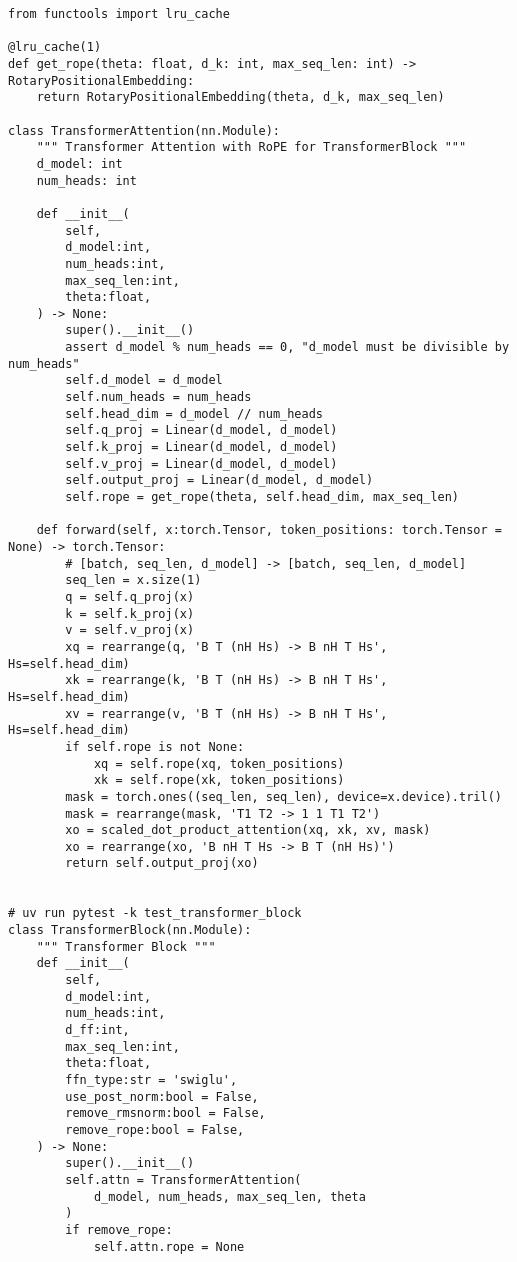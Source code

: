 \begin{lstlisting}
from functools import lru_cache

@lru_cache(1)
def get_rope(theta: float, d_k: int, max_seq_len: int) -> RotaryPositionalEmbedding:
    return RotaryPositionalEmbedding(theta, d_k, max_seq_len)

class TransformerAttention(nn.Module):
    """ Transformer Attention with RoPE for TransformerBlock """
    d_model: int
    num_heads: int
    
    def __init__(
        self, 
        d_model:int, 
        num_heads:int,
        max_seq_len:int,
        theta:float,
    ) -> None:
        super().__init__()
        assert d_model % num_heads == 0, "d_model must be divisible by num_heads"
        self.d_model = d_model
        self.num_heads = num_heads
        self.head_dim = d_model // num_heads
        self.q_proj = Linear(d_model, d_model)
        self.k_proj = Linear(d_model, d_model)
        self.v_proj = Linear(d_model, d_model)
        self.output_proj = Linear(d_model, d_model)
        self.rope = get_rope(theta, self.head_dim, max_seq_len)
    
    def forward(self, x:torch.Tensor, token_positions: torch.Tensor = None) -> torch.Tensor:
        # [batch, seq_len, d_model] -> [batch, seq_len, d_model]
        seq_len = x.size(1)
        q = self.q_proj(x)
        k = self.k_proj(x)
        v = self.v_proj(x)
        xq = rearrange(q, 'B T (nH Hs) -> B nH T Hs', Hs=self.head_dim)
        xk = rearrange(k, 'B T (nH Hs) -> B nH T Hs', Hs=self.head_dim)
        xv = rearrange(v, 'B T (nH Hs) -> B nH T Hs', Hs=self.head_dim)
        if self.rope is not None:
            xq = self.rope(xq, token_positions)
            xk = self.rope(xk, token_positions)
        mask = torch.ones((seq_len, seq_len), device=x.device).tril()
        mask = rearrange(mask, 'T1 T2 -> 1 1 T1 T2')
        xo = scaled_dot_product_attention(xq, xk, xv, mask)
        xo = rearrange(xo, 'B nH T Hs -> B T (nH Hs)')
        return self.output_proj(xo)


# uv run pytest -k test_transformer_block
class TransformerBlock(nn.Module):
    """ Transformer Block """
    def __init__(
        self,
        d_model:int,
        num_heads:int,
        d_ff:int,
        max_seq_len:int,
        theta:float,
        ffn_type:str = 'swiglu',
        use_post_norm:bool = False,
        remove_rmsnorm:bool = False,
        remove_rope:bool = False,
    ) -> None:
        super().__init__()
        self.attn = TransformerAttention(
            d_model, num_heads, max_seq_len, theta
        )
        if remove_rope:
            self.attn.rope = None


\end{lstlisting}
